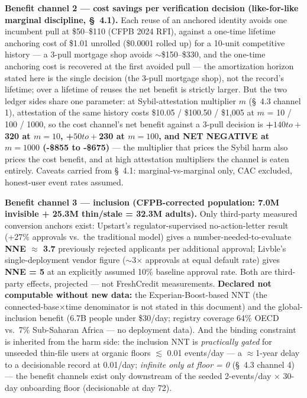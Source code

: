 \documentclass[11pt,twocolumn]{article}
\begin{document}
\textbf{Benefit channel 2 --- cost savings per verification decision (like-for-like marginal discipline, \S~4.1).} Each reuse of an anchored identity avoids one incumbent pull at \$50--\$110 (CFPB 2024 RFI), against a one-time lifetime anchoring cost of \$1.01 unrolled (\$0.0001 rolled up) for a 10-unit competitive history --- a 3-pull mortgage shop avoids $\sim$\$150--\$330, and the one-time anchoring cost is recovered at the first avoided pull --- the amortization horizon stated here is the single decision (the 3-pull mortgage shop), not the record's lifetime; over a lifetime of reuses the net benefit is strictly larger. But the two ledger sides share one parameter: at Sybil-attestation multiplier $m$ (\S~4.3 channel 1), attestation of the same history costs \$10.05 / \$100.50 / \$1{,}005 at $m$ = 10 / 100 / 1000, so the cost channel's net benefit against a 3-pull decision is \textbf{+$140 to +$320 at $m = 10$, +$50 to +$230 at $m = 100$, and NET NEGATIVE at $m = 1000$ (-\$855 to -\$675)} --- the multiplier that prices the Sybil harm also prices the cost benefit, and at high attestation multipliers the channel is eaten entirely. Caveats carried from \S~4.1: marginal-vs-marginal only, CAC excluded, honest-user event rates assumed.

\textbf{Benefit channel 3 --- inclusion (CFPB-corrected population: 7.0M invisible + 25.3M thin/stale = 32.3M adults).} Only third-party measured conversion anchors exist: Upstart's regulator-supervised no-action-letter result (+27\% approvals vs.\ the traditional model) gives a number-needed-to-evaluate \textbf{NNE $\approx$ 3.7} previously rejected applicants per additional approval; Livble's single-deployment vendor figure ($\sim$3$\times$ approvals at equal default rate) gives \textbf{NNE = 5} at an explicitly assumed 10\% baseline approval rate. Both are third-party effects, projected --- not FreshCredit measurements. \textbf{Declared not computable without new data:} the Experian-Boost-based NNT (the connected-base$\times$time denominator is not stated in this document) and the global-inclusion benefit (6.7B people under \$30/day; registry coverage 64\% OECD vs.\ 7\% Sub-Saharan Africa --- no deployment data). And the binding constraint is inherited from the harm side: the inclusion NNT is \emph{practically gated} for unseeded thin-file users at organic floors $\lesssim$ 0.01 events/day --- a $\approx$1-year delay to a decisionable record at 0.01/day; \emph{infinite only at floor = 0} (\S~4.3 channel 4) --- the benefit channels exist only downstream of the seeded 2-events/day $\times$ 30-day onboarding floor (decisionable at day 72).
\end{document}
